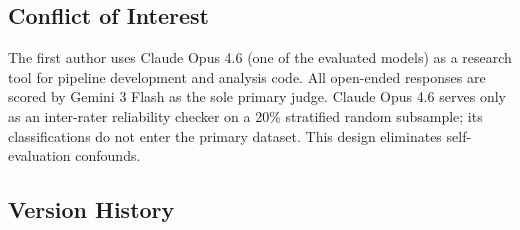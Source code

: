 \documentclass[
  11pt,
]{article}
\begin{document}
\subsection{Conflict of Interest}\label{conflict-of-interest}

The first author uses Claude Opus 4.6 (one of the evaluated models) as a
research tool for pipeline development and analysis code. All open-ended
responses are scored by Gemini 3 Flash as the sole primary judge. Claude
Opus 4.6 serves only as an inter-rater reliability checker on a 20\%
stratified random subsample; its classifications do not enter the
primary dataset. This design eliminates self-evaluation confounds.

\subsection{Version History}\label{version-history}
\end{document}
